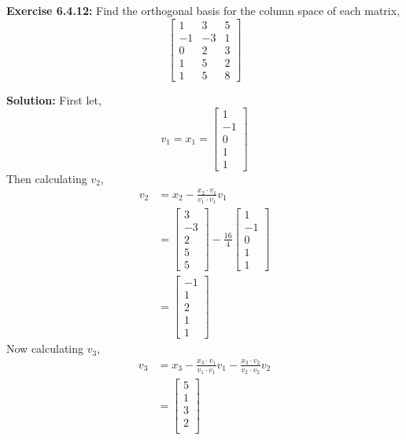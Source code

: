 \documentclass{amsart}
\begin{document}
\begin{enumerate}
\noindent\textbf{Exercise 6.4.12: }Find the orthogonal basis for the column space of each matrix,
\begin{equation*}
\begin{bmatrix}
1 &3&  5\\
-1&-3&1\\
0&2&3\\
1&5&2\\
1&5&8
\end{bmatrix}
\end{equation*}

\textbf{Solution: } First let,
\begin{equation*}
v_1 = x_1 = 
\begin{bmatrix}
1\\
-1\\
0\\
1\\
1
\end{bmatrix}
\end{equation*}
Then calculating $v_2$,
\begin{align*}
v_2 &= x_2  - \frac{x_2 \cdot v_1}{v_1 \cdot v_1}v_1\\
&= 
\begin{bmatrix}
3\\
-3\\
2\\
5\\
5
\end{bmatrix} -
\frac{16}{4}
\begin{bmatrix}
1\\
-1\\
0\\
1\\
1
\end{bmatrix}\\
&=
\begin{bmatrix}
-1\\
1\\
2\\
1\\
1
\end{bmatrix}
\end{align*}
Now calculating $v_3$,
\begin{align*}
v_3 &= x_3  - \frac{x_3 \cdot v_1}{v_1 \cdot v_1}v_1 - \frac{x_3 \cdot v_2}{v_2 \cdot v_2}v_2\\
&=
\begin{bmatrix}
5\\
1\\
3\\
2\\

\end{bmatrix}
\end{align*}
\end{enumerate}
\end{document}
